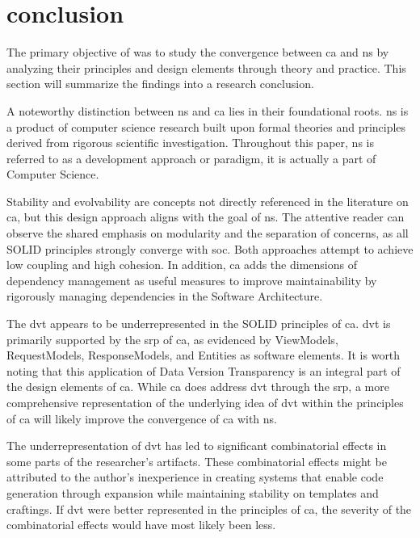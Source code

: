 \section{conclusion}

The primary objective of  was to study the
convergence between \gls{ca} and \gls{ns} by analyzing their principles and design
elements through theory and practice. This section will summarize the findings into a
research conclusion.

A noteworthy distinction between \gls{ns} and \gls{ca} lies in their foundational roots.
\gls{ns} is a product of computer science research built upon formal theories and
principles derived from rigorous scientific investigation. Throughout this
paper, \gls{ns} is referred to as a development approach or paradigm, it is actually a
part of Computer Science.

Stability and evolvability are concepts not directly referenced in the literature on
\gls{ca}, but this design approach aligns with the goal of \gls{ns}. The attentive reader
can observe the shared emphasis on modularity and the separation of concerns, as all SOLID
principles strongly converge with \gls{soc}. Both approaches attempt to achieve low
coupling and high cohesion. In addition, \gls{ca} adds the dimensions of dependency
management as useful measures to improve maintainability by rigorously managing
dependencies in the Software Architecture.

The \gls{dvt} appears to be underrepresented in the SOLID principles of \gls{ca}.
\gls{dvt} is primarily supported by the \gls{srp} of \gls{ca}, as evidenced by ViewModels,
RequestModels, ResponseModels, and Entities as software elements. It is worth noting that
this application of Data Version Transparency  is an integral part of the design elements
of \gls{ca}. While \gls{ca} does address \gls{dvt} through the \gls{srp}, a more
comprehensive representation of the underlying idea of \gls{dvt} within the principles of
\gls{ca} will likely improve the convergence of \gls{ca} with \gls{ns}.

The underrepresentation of \gls{dvt} has led to significant combinatorial effects in some
parts of the researcher's artifacts. These combinatorial effects might be attributed to the
author's inexperience in creating systems that enable code generation through expansion
while maintaining stability on templates and craftings. If \gls{dvt} were better
represented in the principles of \gls{ca}, the severity of the combinatorial effects would
have most likely been less.

